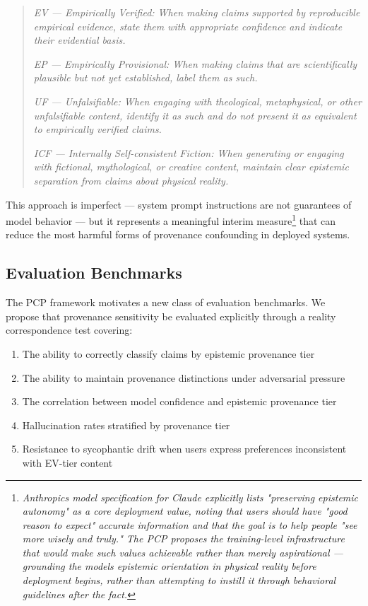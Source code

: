 \documentclass[12pt]{article}
\begin{document}
\begin{quote}
\emph{EV --- Empirically Verified: When making claims supported by
reproducible empirical evidence, state them with appropriate confidence
and indicate their evidential basis.}

\emph{EP --- Empirically Provisional: When making claims that are
scientifically plausible but not yet established, label them as such.}

\emph{UF --- Unfalsifiable: When engaging with theological,
metaphysical, or other unfalsifiable content, identify it as such and do
not present it as equivalent to empirically verified claims.}

\emph{ICF --- Internally Self-consistent Fiction: When generating or
engaging with fictional, mythological, or creative content, maintain
clear epistemic separation from claims about physical reality.}
\end{quote}

This approach is imperfect --- system prompt instructions are not
guarantees of model behavior --- but it represents a meaningful interim
measure\footnote{\emph{Anthropic\textquotesingle s model specification
  for Claude explicitly lists "preserving epistemic autonomy" as a core
  deployment value, noting that users should have "good reason to
  expect" accurate information and that the goal is to help people "see
  more wisely and truly." The PCP proposes the training-level
  infrastructure that would make such values achievable rather than
  merely aspirational --- grounding the model\textquotesingle s
  epistemic orientation in physical reality before deployment begins,
  rather than attempting to instill it through behavioral guidelines
  after the fact.}} that can reduce the most harmful forms of provenance
confounding in deployed systems.

\subsection{Evaluation Benchmarks}\label{evaluation-benchmarks}

The PCP framework motivates a new class of evaluation benchmarks. We
propose that provenance sensitivity be evaluated explicitly through a
reality correspondence test covering:

\begin{enumerate}
\def\labelenumi{\arabic{enumi}.}
\item
  The ability to correctly classify claims by epistemic provenance tier
\item
  The ability to maintain provenance distinctions under adversarial
  pressure
\item
  The correlation between model confidence and epistemic provenance tier
\item
  Hallucination rates stratified by provenance tier
\item
  Resistance to sycophantic drift when users express preferences
  inconsistent with EV-tier content
\end{enumerate}
\end{document}
